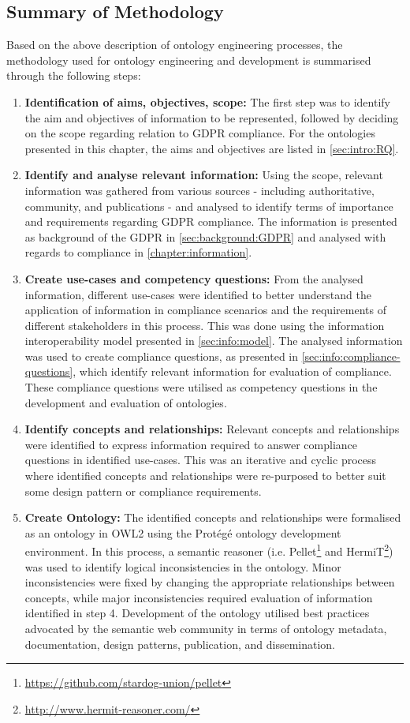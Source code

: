 \subsection*{Summary of Methodology}
Based on the above description of ontology engineering processes, the methodology used for ontology engineering and development is summarised through the following steps:
\begin{enumerate}
    \item \textbf{Identification of aims, objectives, scope:} The first step was to identify the aim and objectives of information to be represented, followed by deciding on the scope regarding relation to GDPR compliance. For the ontologies presented in this chapter, the aims and objectives are listed in \autoref{sec:intro:RQ}. %
    \item \textbf{Identify and analyse relevant information:} Using the scope, relevant information was gathered from various sources - including authoritative, community, and publications - and analysed to identify terms of importance and requirements regarding GDPR compliance. The information is presented as background of the GDPR in \autoref{sec:background:GDPR} and analysed with regards to compliance in \autoref{chapter:information}.
    \item \textbf{Create use-cases and competency questions:} From the analysed information, different use-cases were identified to better understand the application of information in compliance scenarios and the requirements of different stakeholders in this process. This was done using the information interoperability model presented in \autoref{sec:info:model}. The analysed information was used to create compliance questions, as presented in \autoref{sec:info:compliance-questions}, which identify relevant information for evaluation of compliance. These compliance questions were utilised as competency questions in the development and evaluation of ontologies.
    \item \textbf{Identify concepts and relationships:} Relevant concepts and relationships were identified to express information required to answer compliance questions in identified use-cases. This was an iterative and cyclic process where identified concepts and relationships were re-purposed to better suit some design pattern or compliance requirements.
    \item \textbf{Create Ontology:} The identified concepts and relationships were formalised as an ontology in OWL2 using the Protégé ontology development environment. In this process, a semantic reasoner (i.e. Pellet\footnote{\url{https://github.com/stardog-union/pellet}} and HermiT\footnote{\url{http://www.hermit-reasoner.com/}}) was used to identify logical inconsistencies in the ontology. Minor inconsistencies were fixed by changing the appropriate relationships between concepts, while major inconsistencies required evaluation of information identified in step 4. Development of the ontology utilised best practices advocated by the semantic web community in terms of ontology metadata, documentation, design patterns, publication, and dissemination.

\end{enumerate}
